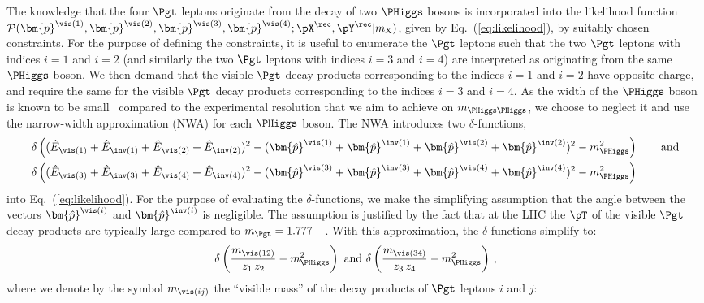 The knowledge that the four $\Pgt$ leptons originate from the decay of two $\PHiggs$ bosons is incorporated into the likelihood function 
$\mathcal{P}(\bm{p}^{\vis(1)},\bm{p}^{\vis(2)},\bm{p}^{\vis(3)},\bm{p}^{\vis(4)};\pX^{\rec},\pY^{\rec}|m_{\textrm{X}})$,
given by Eq.~(\ref{eq:likelihood}), by suitably chosen constraints.
For the purpose of defining the constraints, it is useful to enumerate the $\Pgt$ leptons 
such that the two $\Pgt$ leptons with indices $i=1$ and $i=2$ (and similarly the two $\Pgt$ leptons with indices $i=3$ and $i=4$) are interpreted as originating from the same $\PHiggs$ boson.
We then demand that the visible $\Pgt$ decay products corresponding to the indices $i=1$ and $i=2$ have opposite charge,
and require the same for the visible $\Pgt$ decay products corresponding to the indices $i=3$ and $i=4$.
As the width of the $\PHiggs$ boson is known to be small~\cite{HIG-14-002,Aad:2015xua} compared to the experimental resolution that we aim to achieve on $m_{\PHiggs\PHiggs}$,
we choose to neglect it and use the narrow-width approximation (NWA) for each $\PHiggs$ boson.
The NWA introduces two $\delta$-functions, 
\begin{align}
 & \delta\left( (\hat{E}_{\vis(1)} + \hat{E}_{\inv(1)} + \hat{E}_{\vis(2)} + \hat{E}_{\inv(2)})^{2} - (\bm{\hat{p}}^{\vis(1)} + \bm{\hat{p}}^{\inv(1)} + \bm{\hat{p}}^{\vis(2)} + \bm{\hat{p}}^{\inv(2)})^{2} - m_{\PHiggs}^{2} \right) \qquad \mbox{and} \nonumber \\
 & \delta\left( (\hat{E}_{\vis(3)} + \hat{E}_{\inv(3)} + \hat{E}_{\vis(4)} + \hat{E}_{\inv(4)})^{2} - (\bm{\hat{p}}^{\vis(3)} + \bm{\hat{p}}^{\inv(3)} + \bm{\hat{p}}^{\vis(4)} + \bm{\hat{p}}^{\inv(4)})^{2} - m_{\PHiggs}^{2} \right)
\end{align}
into Eq.~(\ref{eq:likelihood}).
For the purpose of evaluating the $\delta$-functions,
we make the simplifying assumption that the angle between the vectors $\bm{\hat{p}}^{\vis(i)}$ and $\bm{\hat{p}}^{\inv(i)}$ is negligible.
The assumption is justified by the fact that at the LHC the $\pT$ of the visible $\Pgt$ decay products are typically large compared to $m_{\Pgt} = 1.777$~\GeV~\cite{PDG}.
With this approximation, the $\delta$-functions simplify to:
\begin{equation*}
\delta\left(\frac{m_{\vis(12)}}{z_{1} \, z_{2}} - m_{\PHiggs}^{2}\right) \mbox{ and } \delta\left(\frac{m_{\vis(34)}}{z_{3} \, z_{4}} - m_{\PHiggs}^{2}\right) \, ,
\end{equation*}
where we denote by the symbol $m_{\vis(ij)}$ the ``visible mass'' of the decay products of $\Pgt$ leptons $i$ and $j$:
